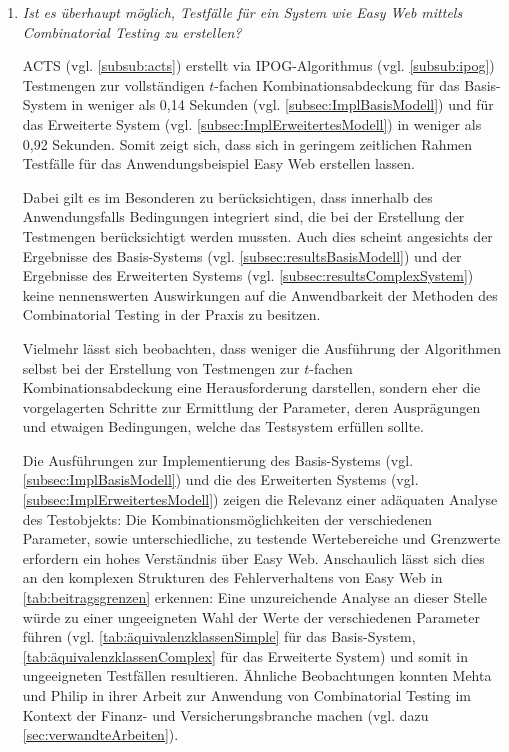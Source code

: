 \begin{enumerate}
\item \textit{Ist es überhaupt möglich, Testfälle für ein System wie Easy Web mittels Combinatorial Testing zu erstellen?}

ACTS (vgl. \autoref{subsub:acts}) erstellt via IPOG-Algorithmus (vgl. \autoref{subsub:ipog}) Testmengen zur vollständigen $t$-fachen Kombinationsabdeckung  für das Basis-System in weniger als 0,14 Sekunden (vgl. \autoref{subsec:ImplBasisModell}) und für das Erweiterte System (vgl. \autoref{subsec:ImplErweitertesModell}) in weniger als 0,92 Sekunden. Somit zeigt sich, dass sich in geringem zeitlichen Rahmen Testfälle für das Anwendungsbeispiel Easy Web erstellen lassen.

Dabei gilt es im Besonderen zu berücksichtigen, dass innerhalb des Anwendungsfalls Bedingungen integriert sind, die bei der Erstellung der Testmengen berücksichtigt werden mussten. Auch dies scheint angesichts der Ergebnisse des Basis-Systems (vgl. \autoref{subsec:resultsBasisModell}) und der Ergebnisse des Erweiterten Systems (vgl. \autoref{subsec:resultsComplexSystem}) keine nennenswerten Auswirkungen auf die Anwendbarkeit der Methoden des Combinatorial Testing in der Praxis zu besitzen.

Vielmehr lässt sich beobachten, dass weniger die Ausführung der Algorithmen selbst bei der Erstellung von Testmengen zur $t$-fachen Kombinationsabdeckung eine Herausforderung darstellen, sondern eher die vorgelagerten Schritte zur Ermittlung der Parameter, deren Ausprägungen und etwaigen Bedingungen, welche das Testsystem erfüllen sollte.

Die Ausführungen zur Implementierung des Basis-Systems (vgl. \autoref{subsec:ImplBasisModell}) und die des Erweiterten Systems (vgl. \autoref{subsec:ImplErweitertesModell}) zeigen die Relevanz einer adäquaten Analyse des Testobjekts: 
Die Kombinationsmöglichkeiten der verschiedenen Parameter, sowie unterschiedliche, zu testende Wertebereiche und Grenzwerte erfordern ein hohes Verständnis über Easy Web. Anschaulich lässt sich dies an den komplexen Strukturen des Fehlerverhaltens von Easy Web in \autoref{tab:beitragsgrenzen} erkennen: Eine unzureichende Analyse an dieser Stelle würde zu einer ungeeigneten Wahl der Werte der verschiedenen Parameter führen (vgl. \autoref{tab:äquivalenzklassenSimple} für das Basis-System, \autoref{tab:äquivalenzklassenComplex} für das Erweiterte System) und somit in ungeeigneten Testfällen resultieren. Ähnliche Beobachtungen konnten Mehta und Philip \cite{mehta2013applications} in ihrer Arbeit zur Anwendung von Combinatorial Testing im Kontext der Finanz- und Versicherungsbranche machen (vgl. dazu \autoref{sec:verwandteArbeiten}).



\end{enumerate}
